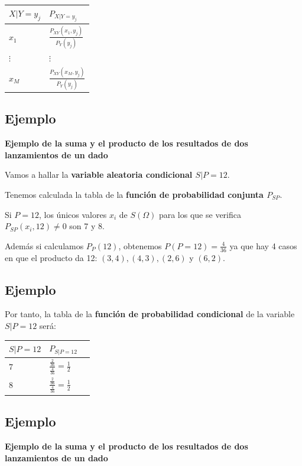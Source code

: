 \documentclass[]{book}
\begin{document}
\begin{longtable}[]{@{}ll@{}}
\toprule
\(X|Y=y_j\) & \(P_{X|Y=y_j}\)\tabularnewline
\midrule
\endhead
\(x_1\) & \(\frac{P_{XY}(x_1,y_j)}{P_Y(y_j)}\)\tabularnewline
\(\vdots\) & \(\vdots\)\tabularnewline
\(x_M\) & \(\frac{P_{XY}(x_M,y_j)}{P_Y(y_j)}\)\tabularnewline
\bottomrule
\end{longtable}

\hypertarget{ejemplo-64}{%
\subsection{Ejemplo}\label{ejemplo-64}}

\textbf{Ejemplo de la suma y el producto de los resultados de dos lanzamientos de un dado}

Vamos a hallar la \textbf{variable aleatoria condicional \(S|P=12\)}.

Tenemos calculada la tabla de la \textbf{función de probabilidad conjunta \(P_{SP}\)}.

Si \(P=12\), los únicos valores \(x_i\) de \(S(\Omega)\) para los que se verifica \(P_{SP}(x_i,12)\neq 0\) son 7 y 8.

Además si calculamos \(P_P(12)\), obtenemos \(P(P=12)=\frac{4}{36}\) ya que hay 4 casos en que el producto da 12: \((3,4), (4,3), (2,6)\) y \((6,2)\).

\hypertarget{ejemplo-65}{%
\subsection{Ejemplo}\label{ejemplo-65}}

Por tanto, la tabla de la \textbf{función de probabilidad condicional} de la variable \(S|P=12\) será:

\begin{longtable}[]{@{}lll@{}}
\toprule
\(S|P=12\) & \(P_{S|P=12}\) &\tabularnewline
\midrule
\endhead
\(7\) & \(\frac{\frac{2}{36}}{\frac{4}{36}}=\frac{1}{2}\) &\tabularnewline
\(8\) & \(\frac{\frac{2}{36}}{\frac{4}{36}}=\frac{1}{2}\) &\tabularnewline
\bottomrule
\end{longtable}

\hypertarget{ejemplo-66}{%
\subsection{Ejemplo}\label{ejemplo-66}}

\textbf{Ejemplo de la suma y el producto de los resultados de dos lanzamientos de un dado}
\end{document}

